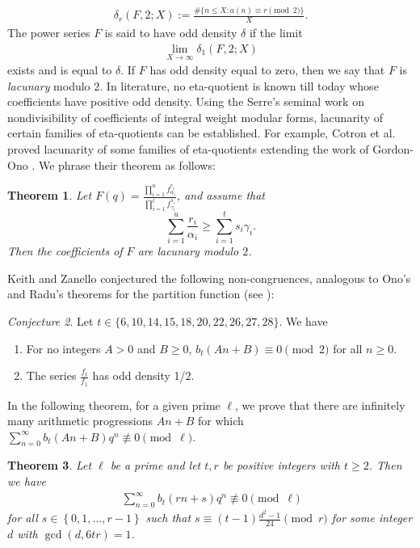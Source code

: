\documentclass[reqno]{amsart}
\newtheorem{theorem}{Theorem}[section]
\theoremstyle{definition}
\theoremstyle{remark}
\newtheorem{conj}[theorem]{Conjecture}
\numberwithin{equation}{section}
\begin{document}
\begin{align*}
\delta_r(F, 2; X):=\frac{\#\{n\leq X: a(n)\equiv r \pmod{2}\}}{X}.
\end{align*} 
The power series $F$ is said to have odd density $\delta$ if the limit
\begin{align*}
\lim _{X\rightarrow \infty}\delta_1(F, 2; X)
\end{align*}
exists and is equal to $\delta$. If $F$ has odd density equal to zero, then we say that $F$ is {\it lacunary} modulo 2. In literature, no eta-quotient is known till today whose coefficients have positive odd density.
Using the Serre's seminal work on nondivisibility of coefficients of integral weight modular forms, lacunarity of certain families of eta-quotients can be established.
For example, Cotron et al. \cite{Cotron2020} proved lacunarity of some families of eta-quotients extending the work of Gordon-Ono \cite{gordon1997}. We phrase their theorem as follows:
\begin{theorem}\cite[Theorem 1.1]{Cotron2020}\label{Cotron}
	Let $F(q)=\frac{\prod_{i=1}^{u}f^{r_i}_{\alpha_{i}}}{\prod_{i=1}^{t}f^{s_i}_{\gamma_{i}}}$, and assume that
	\begin{equation*}
	\sum_{i=1}^{u}\frac{r_i}{\alpha_{i}}\geq\sum_{i=1}^{t}s_i\gamma_{i}.
	\end{equation*}
	Then the coefficients of $F$ are lacunary modulo $2$.
\end{theorem}
Keith and Zanello \cite{Keith2021} conjectured the following non-congruences, analogous to Ono's and Radu's theorems for the partition function (see \cite{ono1996, radu2}):
\begin{conj}\cite[Conjecture 15]{Keith2021}\label{conj3}
Let $t\in \{6,10,14,15,18,20,22,26,27,28\}$. We have
\begin{enumerate}
\item For no integers $A>0$ and $B\geq 0$, $b_t(An+ B)\equiv 0\pmod 2$ for all $n\geq 0$.
\item The series $\frac{f_t}{f_1}$ has odd density 1/2.
\end{enumerate}
\end{conj}
In the following theorem, for a given prime $\ell$, we prove that there are infinitely many arithmetic progressions $An+B$ for which $\sum_{n=0}^{\infty}b_t(An+B)q^n\not\equiv 0\pmod{\ell}$.
\begin{theorem}\label{thm3}
Let $\ell$ be a prime and let $t,r$ be positive integers with $t\geq 2$. Then we have
\begin{align*}
\sum_{n=0}^{\infty} b_t(rn+s)q^{n}\not\equiv 0 \pmod {\ell}
\end{align*} 
for all $s\in\left\lbrace 0,1,\ldots,r-1\right\rbrace $ such that
$
s\equiv (t-1)\frac{d^{2}-1}{24} \pmod{r}
$
for some integer $d$ with $\gcd(d,6tr)=1$.
\end{theorem}	
\end{document}
